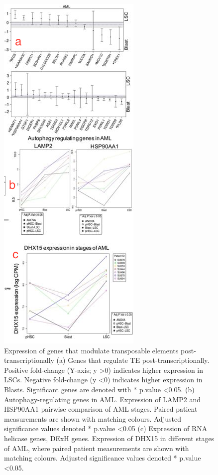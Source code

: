 \begin{figure}
    \centering
    \includegraphics[scale=0.8]{tex/tes/fig7-aml.png}
    \caption{Expression of genes that modulate transposable elements post-transcriptionally (a) Genes that regulate TE post-transcriptionally. Positive fold-change (Y-axis; y \textgreater 0) indicates higher expression in LSCs. Negative fold-change (y \textless 0) indicates higher expression in Blasts. Significant genes are denoted with * p.value \textless 0.05. (b) Autophagy-regulating genes in AML. Expression of LAMP2 and HSP90AA1 pairwise comparison of AML stages. Paired patient measurements are shown with matching colours. Adjusted significance values denoted * p.value \textless 0.05 (c) Expression of RNA helicase genes, DExH genes. Expression of DHX15 in different stages of AML, where paired patient measurements are shown with matching colours. Adjusted significance values denoted * p.value \textless 0.05.}
    \label{fig:tes7}
\end{figure}

